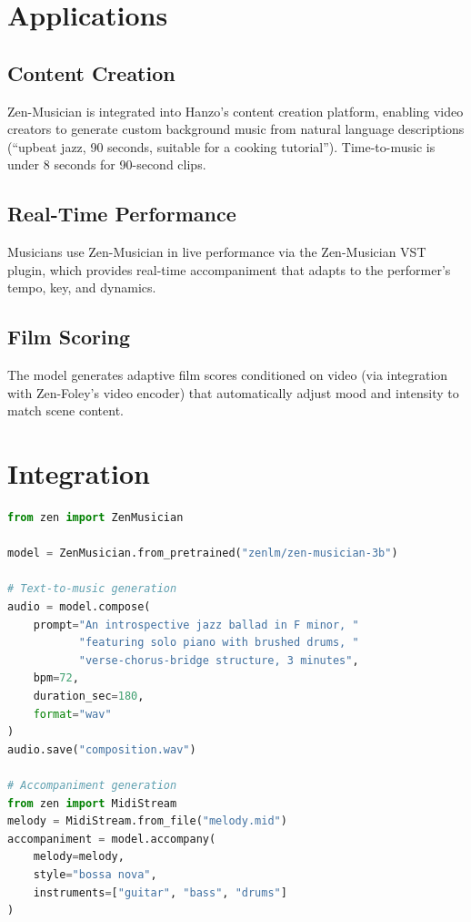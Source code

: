 \documentclass[11pt,a4paper]{article}
\begin{document}
\section{Applications}

\subsection{Content Creation}

Zen-Musician is integrated into Hanzo's content creation platform, enabling video creators to
generate custom background music from natural language descriptions (``upbeat jazz, 90 seconds,
suitable for a cooking tutorial''). Time-to-music is under 8 seconds for 90-second clips.

\subsection{Real-Time Performance}

Musicians use Zen-Musician in live performance via the Zen-Musician VST plugin, which provides
real-time accompaniment that adapts to the performer's tempo, key, and dynamics.

\subsection{Film Scoring}

The model generates adaptive film scores conditioned on video (via integration with Zen-Foley's
video encoder) that automatically adjust mood and intensity to match scene content.

\section{Integration}

\begin{lstlisting}[language=Python, caption=Zen-Musician Composition Generation]
from zen import ZenMusician

model = ZenMusician.from_pretrained("zenlm/zen-musician-3b")

# Text-to-music generation
audio = model.compose(
    prompt="An introspective jazz ballad in F minor, "
           "featuring solo piano with brushed drums, "
           "verse-chorus-bridge structure, 3 minutes",
    bpm=72,
    duration_sec=180,
    format="wav"
)
audio.save("composition.wav")

# Accompaniment generation
from zen import MidiStream
melody = MidiStream.from_file("melody.mid")
accompaniment = model.accompany(
    melody=melody,
    style="bossa nova",
    instruments=["guitar", "bass", "drums"]
)
\end{lstlisting}
\end{document}
